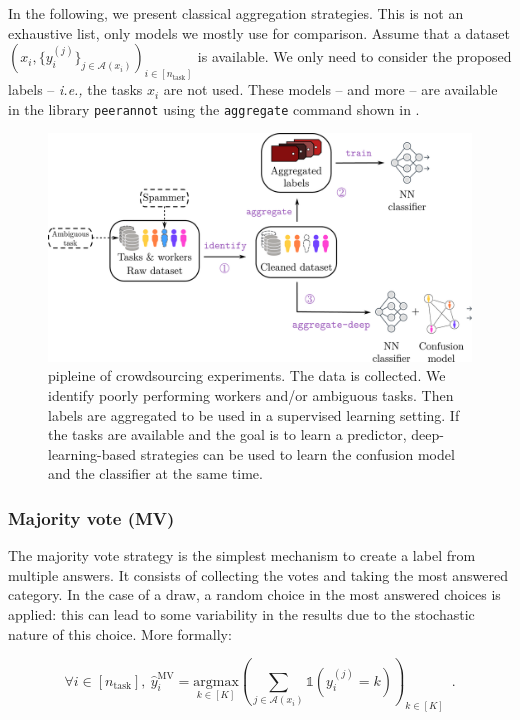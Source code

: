 In the following, we present classical aggregation strategies.
This is not an exhaustive list, only models we mostly use for comparison.
Assume that a dataset $\left(x_i, \{y_i^{(j)}\}_{j\in\mathcal{A}(x_i)}\right)_{i\in [n_\text{task}]}$ is available.
We only need to consider the proposed labels -- \emph{i.e.,} the tasks $x_i$ are not used.
These models -- and more -- are available in the library \texttt{peerannot} using the \texttt{aggregate} command shown in .

\begin{figure}[ht]
    \centering
    \includegraphics[width=\textwidth]{chapters/images/strategies_crowd_data.pdf}
    \caption{pipleine of crowdsourcing experiments. The data is collected. We identify poorly performing workers and/or ambiguous tasks. Then labels are aggregated to be used in a supervised learning setting. If the tasks are available and the goal is to learn a predictor, deep-learning-based strategies can be used to learn the confusion model and the classifier at the same time.}
    \label{fig:pipeline_crowdsourcing}
\end{figure}

\subsubsection{Majority vote (MV)}
\label{subsub:mv}

The majority vote strategy is the simplest mechanism to create a label from multiple answers.
It consists of collecting the votes and taking the most answered category.
In the case of a draw, a random choice in the most answered choices is applied: this can lead to some variability in the results due to the stochastic nature of this choice.
More formally:

\begin{equation}\label{eq:mv}
    \forall i\in [n_\text{task}],\ \hat y_i^{\mathrm{MV}} = \underset{k\in[K]}{\mathrm{argmax}}\left(\sum_{j\in\mathcal{A}(x_i)} \mathds{1}(y_i^{(j)}=k)\right)_{k\in[K]} \enspace.
\end{equation}

